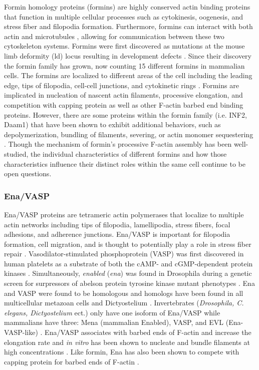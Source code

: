 Formin homology proteins (formins) are highly conserved actin binding proteins that function in multiple cellular processes such as cytokinesis, oogenesis, and stress fiber and filopodia formation. Furthermore, formins can interact with both actin and microtubules \citep{bartolini_formin_2008,henty-ridilla_accelerated_2016}, allowing for communication between these two cytoskeleton systems. Formins were first discovered as mutations at the mouse limb deformity (ld) locus resulting in development defects \citep{woychik_formins:_1990}. Since their discovery the formin family has grown, now counting 15 different formins in mammalian cells. The formins are localized to different areas of the cell including the leading edge, tips of filopodia, cell-cell junctions, and cytokinetic rings \citep{pollard_actin_2016}. Formins are implicated in nucleation of nascent actin filaments, processive elongation, and competition with capping protein as well as other F-actin barbed end binding proteins. However, there are some proteins within the formin family (i.e. INF2, Daam1) that have been shown to exhibit additional behaviors, such as depolymerization, bundling of filaments, severing, or actin monomer sequestering \citep{gurel_assembly_2015}. Though the mechanism of formin's processive F-actin assembly has been well-studied, the individual characteristics of different formins and how those characteristics influence their distinct roles within the same cell continue to be open questions. 

\subsubsection{Ena/VASP}
	Ena/VASP proteins are tetrameric actin polymerases that localize to multiple actin networks including tips of filopodia, lamellipodia, stress fibers, focal adhesions, and adherence junctions. Ena/VASP is important for filopodia formation, cell migration, and is thought to potentially play a role in stress fiber repair \cite{kwiatkowski_function_2003}. Vasodilator-stimulated phosphoprotein (VASP) was first discovered in human platelets as a substrate of both the cAMP- and cGMP-dependent protein kinases \citep{halbrugge_analysis_1990}. Simultaneously, \textit{enabled} (\textit{ena}) was found in Drosophila during a genetic screen for surpressors of abelson protein tyrosine kinase mutant phenotypes \citep{gertler_genetic_1990}. Ena and VASP were found to be homologous \citep{ahern-djamali_identification_1999} and homologs have been found in all multicellular metazoan cells and Dictyostelium \citep{sebe-pedros_insights_2013}. Invertebrates (\textit{Drosophila, C. elegans, Dictyostelium} ect.) only have one isoform of Ena/VASP while mammalians have three: Mena (mammalian Enabled), VASP, and EVL (Ena-VASP-like) \cite{gertler_mena_1996}. Ena/VASP associates with barbed ends of F-actin and increase the elongation rate and \textit{in vitro} has been shown to nucleate and bundle filaments at high concentrations \citep{breitsprecher_clustering_2008,breitsprecher_molecular_2011,winkelman_ena/vasp_2014,hansen_vasp_2010,pasic_ena/vasp_2008,bear_ena/vasp:_2009}.
Like formin, Ena has also been shown to compete with capping protein for barbed ends of F-actin \citep{bear_ena/vasp:_2009}. 

